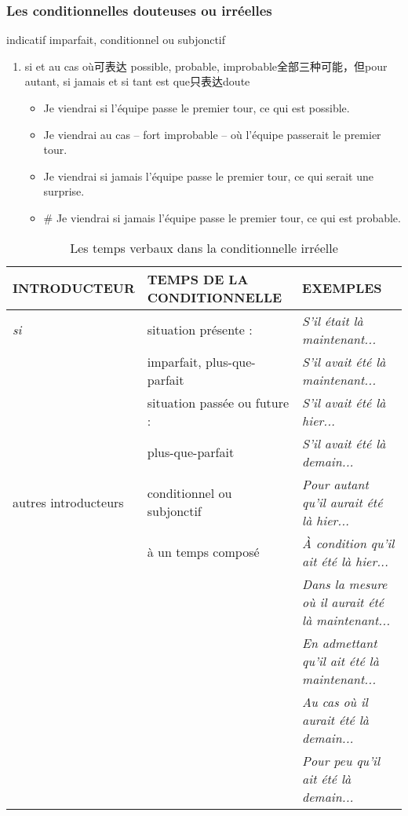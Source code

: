 \documentclass[UTF8]{report}
\begin{document}
\subsubsection{Les conditionnelles douteuses ou irréelles}
indicatif imparfait, conditionnel ou subjonctif
\begin{enumerate}
    \item si et au cas où可表达 possible, probable, improbable全部三种可能，但pour autant, si jamais et si tant est que只表达doute
    \begin{itemize}
        \item Je viendrai si l’équipe passe le premier tour, ce qui est possible.
        \item Je viendrai au cas – fort improbable – où l’équipe passerait le premier tour.
        \item Je viendrai si jamais l’équipe passe le premier tour, ce qui serait une surprise.
        \item \# Je viendrai si jamais l’équipe passe le premier tour, ce qui est probable.
    \end{itemize}
\end{enumerate}
\begin{table}[H]
    \centering 
    \begin{tabular}{|l|l|l|}
    \hline
    \rowcolor{cyan!20}
    \textbf{INTRODUCTEUR} & \textbf{TEMPS DE LA CONDITIONNELLE} & \textbf{EXEMPLES} \\
    \hline
    \textit{si} & situation présente : & \textit{S'il était là maintenant...} \\
    & imparfait, plus-que-parfait & \textit{S'il avait été là maintenant...} \\
    \cline{2-3}
    & situation passée ou future : & \textit{S'il avait été là hier...} \\
    & plus-que-parfait & \textit{S'il avait été là demain...} \\
    \hline
    autres introducteurs & conditionnel ou subjonctif & \textit{Pour autant qu'il aurait été là hier...} \\
    & à un temps composé & \textit{À condition qu'il ait été là hier...} \\
    & & \textit{Dans la mesure où il aurait été là maintenant...} \\
    & & \textit{En admettant qu'il ait été là maintenant...} \\
    & & \textit{Au cas où il aurait été là demain...} \\
    & & \textit{Pour peu qu'il ait été là demain...} \\
    \hline
    \end{tabular}
    \caption{Les temps verbaux dans la conditionnelle irréelle}
\end{table}
\end{document}
